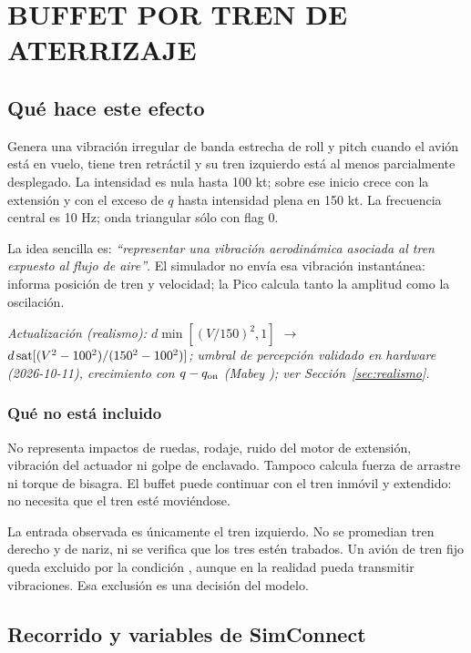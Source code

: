 \section{BUFFET POR TREN DE ATERRIZAJE}
\label{sec:buffet-tren}

\subsection{Qué hace este efecto}
Genera una vibración irregular de banda estrecha de roll y pitch cuando el avión está en vuelo, tiene tren retráctil y su tren izquierdo está al menos parcialmente desplegado. La intensidad es nula hasta 100 kt; sobre ese inicio crece con la extensión y con el exceso de $q$ hasta intensidad plena en 150 kt. La frecuencia central es 10 Hz; onda triangular sólo con flag 0.

La idea sencilla es: \emph{``representar una vibración aerodinámica asociada al tren expuesto al flujo de aire''}. El simulador no envía esa vibración instantánea: informa posición de tren y velocidad; la Pico calcula tanto la amplitud como la oscilación.

\textit{Actualización (realismo): $d\min[(V/150)^2,1]$ $\rightarrow$ $d\operatorname{sat}[(V^2-100^2)/(150^2-100^2)]$; umbral de percepción validado en hardware (2026-10-11), crecimiento con $q-q_{\rm on}$ (Mabey \cite{mabey1988}); ver Sección~\ref{sec:realismo}.}

\subsubsection{Qué no está incluido}
No representa impactos de ruedas, rodaje, ruido del motor de extensión, vibración del actuador ni golpe de enclavado. Tampoco calcula fuerza de arrastre ni torque de bisagra. El buffet puede continuar con el tren inmóvil y extendido: no necesita que el tren esté moviéndose.

La entrada observada es únicamente el tren izquierdo. No se promedian tren derecho y de nariz, ni se verifica que los tres estén trabados. Un avión de tren fijo queda excluido por la condición , aunque en la realidad pueda transmitir vibraciones. Esa exclusión es una decisión del modelo.

\subsection{Recorrido y variables de SimConnect}
